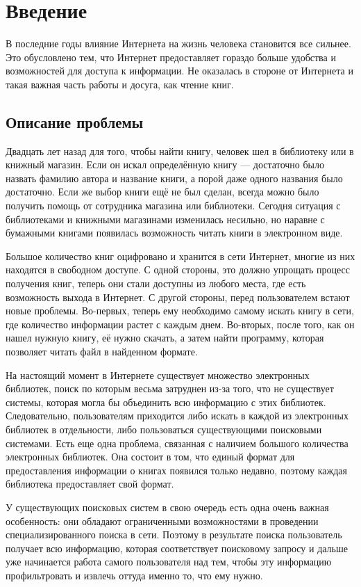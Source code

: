 
\section{Введение}
В последние годы влияние Интернета на жизнь человека становится все сильнее. Это обусловлено тем, что Интернет предоставляет гораздо больше удобства и возможностей для доступа к информации. Не оказалась в стороне от Интернета и такая важная часть работы и досуга, как чтение книг.

\subsection{Описание проблемы}
Двадцать лет назад для того, чтобы найти книгу, человек шел в библиотеку или в книжный магазин. Если он искал определённую книгу --- достаточно было назвать фамилию автора и название книги, а порой даже одного названия было достаточно. Если же выбор книги ещё не был сделан, всегда можно было получить помощь от сотрудника магазина или библиотеки. Сегодня ситуация с библиотеками и книжными магазинами изменилась несильно, но наравне с бумажными книгами появилась возможность читать книги в электронном виде. 

Большое количество книг оцифровано и хранится в сети Интернет, многие из них находятся в свободном доступе. С одной стороны, это должно упрощать процесс получения книг, \tk теперь они стали доступны из любого места, где есть возможность выхода в Интернет. С другой стороны, перед пользователем встают новые проблемы. Во-первых, теперь ему необходимо самому искать книгу в сети, где количество информации растет с каждым днем. Во-вторых, после того, как он нашел нужную книгу, её нужно скачать, а затем найти программу, которая позволяет читать файл в найденном формате. 

На настоящий момент в Интернете существует множество электронных библиотек, поиск по которым весьма затруднен из-за того, что не существует системы, которая могла бы объединить всю информацию с этих библиотек. Следовательно, пользователям приходится либо искать в каждой из электронных библиотек в отдельности, либо пользоваться существующими поисковыми системами. Есть еще одна проблема, связанная с наличием большого количества электронных библиотек. Она состоит в том, что единый формат для предоставления информации о книгах появился только недавно, поэтому каждая библиотека предоставляет свой формат.

У существующих поисковых систем в свою очередь есть одна очень важная особенность: они обладают ограниченными возможностями в проведении специализированного поиска в сети. Поэтому в результате поиска пользователь получает всю информацию, которая соответствует поисковому запросу и дальше уже начинается работа самого пользователя над тем, чтобы эту информацию профильтровать и извлечь оттуда именно то, что ему нужно. 

